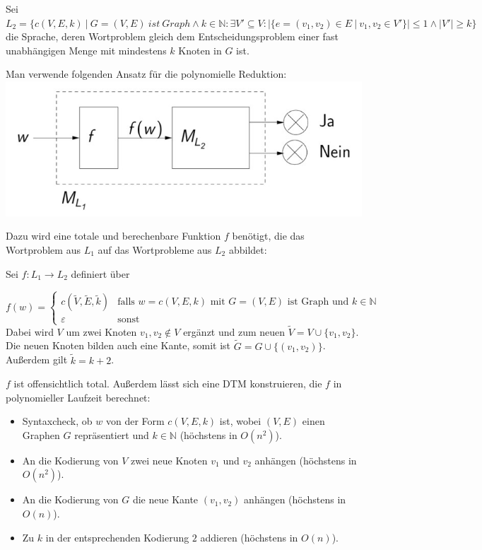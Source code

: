 \begin{teile}
	Sei	$L_2=\{c(V,E,k)\ |\ G=(V,E)\ ist\ Graph \wedge k\in \mathbb{N}: \exists V' \subseteq V:|\{e=(v_1,v_2)\in E\ |\ v_1,v_2 \in V'\}|\leq 1 \wedge |V'|\geq k \}$\\
	die Sprache, deren Wortproblem gleich dem Entscheidungsproblem einer fast unabhängigen Menge mit mindestens $k$ Knoten in $G$ ist.

	Man verwende folgenden Ansatz für die polynomielle Reduktion:\\
	\includegraphics[scale=0.4]{reduction_idee_skizze}

	Dazu wird eine totale und berechenbare Funktion $f$ benötigt, die das Wortproblem aus $L_1$ auf das Wortprobleme aus $L_2$ abbildet:

	Sei $f:L_1 \rightarrow L_2$ definiert über

	$f(w)=\begin{cases}
		c(\tilde{V},\tilde{E},\tilde{k})&\text{falls $w=c(V,E,k)$ mit $G=(V,E)$ ist Graph und $k \in \mathbb{N}$}\\
		\varepsilon &\text{sonst}
	\end{cases}$\\
	Dabei wird $V$ um zwei Knoten $v_1,v_2 \notin V$ ergänzt und zum neuen $\tilde{V}=V\cup \{v_1,v_2\}$. Die neuen Knoten bilden auch eine Kante, somit ist $\tilde{G}=G\cup \{(v_1,v_2)\}$. Außerdem gilt $\tilde{k}=k+2$.

	$f$ ist offensichtlich total. Außerdem lässt sich eine DTM konstruieren, die $f$ in polynomieller Laufzeit berechnet:
	\begin{itemize}
		\item Syntaxcheck, ob $w$ von der Form $c(V,E,k)$ ist, wobei $(V,E)$ einen Graphen $G$ repräsentiert und $k \in \mathbb{N}$ (höchstens in $O(n^2)$).
		\item An die Kodierung von $V$ zwei neue Knoten $v_1$ und $v_2$ anhängen (höchstens in $O(n^2)$).
		\item An die Kodierung von $G$ die neue Kante $(v_1,v_2)$ anhängen (höchstens in $O(n)$).
		\item Zu $k$ in der entsprechenden Kodierung $2$ addieren (höchstens in $O(n)$).
	\end{itemize}


\end{teile}
